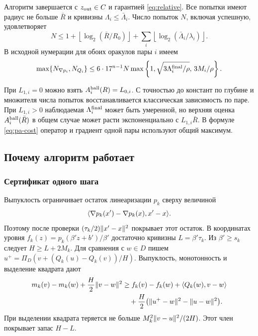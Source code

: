 \begin{theorem}[Путь А]\label{thm:patha}
Алгоритм завершается с $z_{\rm out}\in C$ и гарантией
\eqref{eq:relative}. Все попытки имеют радиус не больше $\bar R$
и кривизны $\Lambda_i\le\bar\Lambda_i$. Число попыток $N$, включая
успешную, удовлетворяет
\begin{equation}\label{eq:pa-restart}
 N\le 1+\left\lfloor\log_2(\bar R/R_0)\right\rfloor
       +\sum_i\left\lfloor\log_2(\bar\Lambda_i/\lambda_i)\right\rfloor .
\end{equation}
В исходной нумерации для обоих оракулов пары $i$ имеем
\begin{equation}\label{eq:pa-cost}
 \max\{N_{\nabla p_i},N_{Q_i}\}\le
 6\cdot17^{n-1}N
 \max\left\{1,\sqrt{3\Lambda_i^{\rm final}/\rho},\,3M_i/\rho\right\}.
\end{equation}
\end{theorem}

При $L_{1,i}=0$ можно взять $A_i^{\rm ball}(R)=L_{0,i}$.
С точностью до констант по глубине и множителя числа попыток
восстанавливается классическая зависимость по паре. При
$L_{1,i}>0$ наблюдаемая $\Lambda_i^{\rm final}$ может быть умеренной,
но верхняя оценка $A_i^{\rm ball}(\bar R)$ в общем случае может расти
экспоненциально с $L_{1,i}\bar R$. В формуле \eqref{eq:pa-cost}
оператор и градиент одной пары используют общий максимум.

\subsection{Почему алгоритм работает}

\subsubsection{Сертификат одного шага}

Выпуклость ограничивает остаток линеаризации $p_k$ сверху величиной
\[
 \langle \nabla p_k(x')-\nabla p_k(x),x'-x\rangle.
\]
Поэтому после проверки
$(\tau_k/2)\lVert x'-x\rVert^2$ покрывает этот остаток. В координатах
уровня $f_k(z)=p_k(\beta'z+b')/\beta'$ достаточно кривизны
$L=\beta'\tau_k$. Из $\beta'\ge s_k$ следует $H\ge L+2M_k$.
Для сравнения с $w\in D$ пишем $u^+=\Pi_D(v+(Q_k(u)-Q_k(v))/H)$.
Выпуклость, монотонность и выделение квадрата дают
\begin{align}
 m_k(v)-m_k(w)+\frac H2\lVert v-w\rVert^2
 &\ge f_k(v)-f_k(w)+\langle Q_k(w),v-w\rangle\notag\\
 &\quad+\frac H2\bigl(\lVert u^+-w\rVert^2-\lVert u-w\rVert^2\bigr).
 \label{eq:pa-model}
\end{align}
При выделении квадрата теряется не больше
$M_k^2\lVert v-u\rVert^2/(2H)$. Этот член покрывает запас $H-L$.

